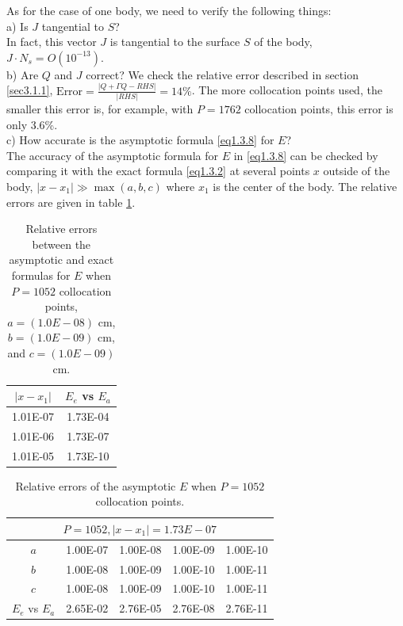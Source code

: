 \documentclass[12pt]{article}
\numberwithin{equation}{section}
\begin{document}
As for the case of one body, we need to verify the following things:\\
a) Is $J$ tangential to $S$? \\
In fact, this vector $J$ is tangential to the surface $S$ of the body, $J\cdot N_s= O(10^{-13})$. \\
b) Are $Q$ and $J$ correct? We check the relative error described in section \ref{sec3.1.1}, $\text{Error} = \frac{|Q+\Gamma Q-RHS|}{|RHS|}=14\%$. The more collocation points used, the smaller this error is, for example, with $P=1762$ collocation points, this error is only 3.6\%.\\
c) How accurate is the asymptotic formula \eqref{eq1.3.8} for $E$?\\
The accuracy of the asymptotic formula for $E$ in \eqref{eq1.3.8} can be checked by comparing it with the exact formula \eqref{eq1.3.2} at several points $x$ outside of the body, $|x-x_1|\gg \max(a,b,c)$ where $x_1$ is the center of the body. The relative errors are given in table \ref{tab3.2.3}.
\begin{table}[htb]
  \centering
  \caption{Relative errors between the asymptotic and exact formulas for $E$ when $P=1052$ collocation points, $a=(1.0E-08)$ cm, $b=(1.0E-09)$ cm, and $c=(1.0E-09)$ cm.}
    \begin{tabular}{cc}
	    \toprule
	    $|x-x_1|$ & $E_{e}$ vs $E_{a}$ \\
	    \midrule
		1.01E-07 & 1.73E-04 \\
	    1.01E-06 & 1.73E-07 \\
	    1.01E-05 & 1.73E-10 \\
	    \bottomrule
    \end{tabular}%
  \label{tab3.2.3}%
\end{table}%
\begin{table}[htb]
  \centering
  \caption{Relative errors of the asymptotic $E$ when $P=1052$ collocation points.}
        \begin{tabular}{ccccc}
	        \toprule
	        \multicolumn{5}{c}{$P=1052, |x-x_1|=1.73E-07$} \\
	        \midrule
			$a$     & 1.00E-07 & 1.00E-08 & 1.00E-09 & 1.00E-10 \\
		    $b$     & 1.00E-08 & 1.00E-09 & 1.00E-10 & 1.00E-11 \\
		    $c$     & 1.00E-08 & 1.00E-09 & 1.00E-10 & 1.00E-11 \\
		    $E_{e}$ vs $E_{a}$ & 2.65E-02 & 2.76E-05 & 2.76E-08 & 2.76E-11 \\	
	        \bottomrule
    \end{tabular}%
  \label{tab3.2.4}%
\end{table}%
\end{document}
